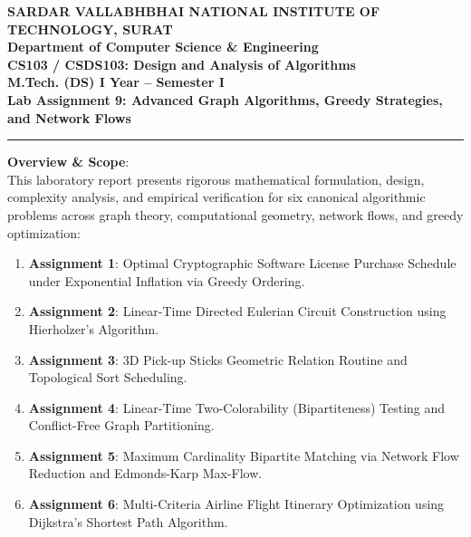 \documentclass[12pt]{article}
\begin{document}
\begin{center}
\textbf{\Large SARDAR VALLABHBHAI NATIONAL INSTITUTE OF TECHNOLOGY, SURAT}\\[4pt]
\textbf{\large Department of Computer Science \& Engineering}\\[3pt]
\textbf{\large CS103 / CSDS103: Design and Analysis of Algorithms}\\[3pt]
\textbf{\large M.Tech. (DS) I Year -- Semester I}\\[4pt]
\textbf{\Large Lab Assignment 9: Advanced Graph Algorithms, Greedy Strategies, and Network Flows}
\end{center}

\vspace{0.2cm}
\hrule
\vspace{0.4cm}

\textbf{Overview \& Scope}:\\
This laboratory report presents rigorous mathematical formulation, design, complexity analysis, and empirical verification for six canonical algorithmic problems across graph theory, computational geometry, network flows, and greedy optimization:
\begin{enumerate}
    \item \textbf{Assignment 1}: Optimal Cryptographic Software License Purchase Schedule under Exponential Inflation via Greedy Ordering.
    \item \textbf{Assignment 2}: Linear-Time Directed Eulerian Circuit Construction using Hierholzer's Algorithm.
    \item \textbf{Assignment 3}: 3D Pick-up Sticks Geometric Relation Routine and Topological Sort Scheduling.
    \item \textbf{Assignment 4}: Linear-Time Two-Colorability (Bipartiteness) Testing and Conflict-Free Graph Partitioning.
    \item \textbf{Assignment 5}: Maximum Cardinality Bipartite Matching via Network Flow Reduction and Edmonds-Karp Max-Flow.
    \item \textbf{Assignment 6}: Multi-Criteria Airline Flight Itinerary Optimization using Dijkstra's Shortest Path Algorithm.
\end{enumerate}

\vspace{0.3cm}

\end{document}
